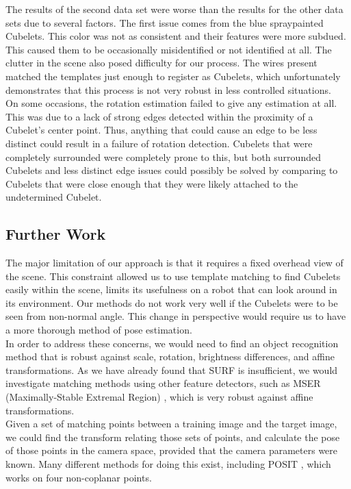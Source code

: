 \documentclass[conference]{IEEEtran}
\begin{document}
The results of the second data set were worse than the results for the other data sets due to several factors.  The first issue comes from the blue spraypainted Cubelets. This color was not as consistent and their features were more subdued. This caused them to be occasionally misidentified or not identified at all.  The clutter in the scene also posed difficulty for our process.  The wires present matched the templates just enough to register as Cubelets, which unfortunately demonstrates that this process is not very robust in less controlled situations.\\

On some occasions, the rotation estimation failed to give any estimation at all.  This was due to a lack of strong edges detected within the proximity of a Cubelet's center point.  Thus, anything that could cause an edge to be less distinct could result in a failure of rotation detection.  Cubelets that were completely surrounded were completely prone to this, but both surrounded Cubelets and less distinct edge issues could possibly be solved by comparing to Cubelets that were close enough that they were likely attached to the undetermined Cubelet.

\subsection{Further Work}
The major limitation of our approach is that it requires a fixed overhead view of the scene.  This constraint allowed us to use template matching to find Cubelets easily within the scene, limits its usefulness on a robot that can look around in its environment.  Our methods do not work very well if the Cubelets were to be seen from non-normal angle.  This change in perspective would require us to have a more thorough method of pose estimation.  \\

In order to address these concerns, we would need to find an object recognition method that is robust against scale, rotation, brightness differences, and affine transformations.  As we have already found that SURF is insufficient, we would investigate matching methods using other feature detectors, such as MSER (Maximally-Stable Extremal Region) \cite{MSER}, which is very robust against affine transformations.\\

Given a set of matching points between a training image and the target image, we could find the transform relating those sets of points, and calculate the pose of those points in the camera space, provided that the camera parameters were known.  Many different methods for doing this exist, including POSIT \cite{POSIT}, which works on four non-coplanar points.
\end{document}
